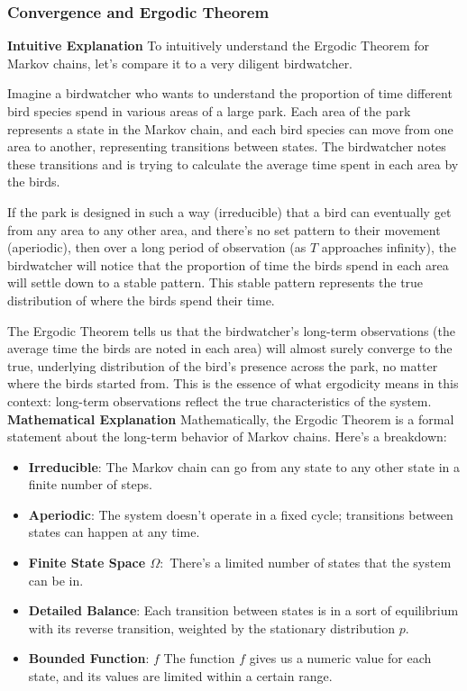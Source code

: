 \documentclass[10pt]{article}
\begin{document}
\subsubsection{Convergence and Ergodic Theorem}
\textbf{Intuitive Explanation}
\newline
To intuitively understand the Ergodic Theorem for Markov chains, let's compare it to a very diligent birdwatcher.

Imagine a birdwatcher who wants to understand the proportion of time different bird species spend in various areas of a large park. Each area of the park represents a state in the Markov chain, and each bird species can move from one area to another, representing transitions between states. The birdwatcher notes these transitions and is trying to calculate the average time spent in each area by the birds.

If the park is designed in such a way (irreducible) that a bird can eventually get from any area to any other area, and there's no set pattern to their movement (aperiodic), then over a long period of observation (as \( T \) approaches infinity), the birdwatcher will notice that the proportion of time the birds spend in each area will settle down to a stable pattern. This stable pattern represents the true distribution of where the birds spend their time.

The Ergodic Theorem tells us that the birdwatcher's long-term observations (the average time the birds are noted in each area) will almost surely converge to the true, underlying distribution of the bird's presence across the park, no matter where the birds started from. This is the essence of what ergodicity means in this context: long-term observations reflect the true characteristics of the system.
\newline
\textbf{Mathematical Explanation}
\newline
Mathematically, the Ergodic Theorem is a formal statement about the long-term behavior of Markov chains. Here's a breakdown:
\begin{itemize}
    \item \textbf{Irreducible}: The Markov chain can go from any state to any other state in a finite number of steps.
    \item \textbf{Aperiodic}: The system doesn't operate in a fixed cycle; transitions between states can happen at any time.
    \item \textbf{Finite State Space \( \Omega :\)} There's a limited number of states that the system can be in.
    \item \textbf{Detailed Balance}: Each transition between states is in a sort of equilibrium with its reverse transition, weighted by the stationary distribution \( p \).
    \item \textbf{Bounded Function}: \( f \) The function \( f \) gives us a numeric value for each state, and its values are limited within a certain range.
\end{itemize}
\end{document}

